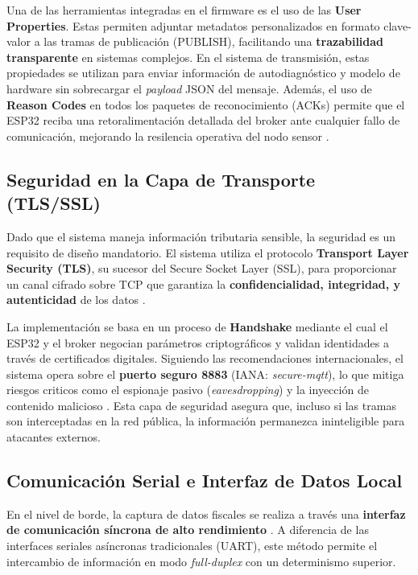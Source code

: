 \par Una de las herramientas integradas en el firmware es el uso de las \textbf{User Properties}. Estas permiten adjuntar metadatos personalizados en formato clave-valor a las tramas de publicación (PUBLISH), facilitando una \textbf{trazabilidad transparente} en sistemas complejos. En el sistema de transmisi\'on, estas propiedades se utilizan para enviar información de autodiagnóstico y modelo de hardware sin sobrecargar el \textit{payload} JSON del mensaje. Además, el uso de \textbf{Reason Codes} en todos los paquetes de reconocimiento (ACKs) permite que el ESP32 reciba una retoralimentación detallada del broker ante cualquier fallo de comunicación, mejorando la resilencia operativa del nodo sensor \cite{OASIS_MQTT_v5}.

\subsection{Seguridad en la Capa de Transporte (TLS/SSL)}

\par Dado que el sistema maneja información tributaria sensible, la seguridad es un requisito de diseño mandatorio. El sistema utiliza el protocolo \textbf{Transport Layer Security (TLS)}, su sucesor del Secure Socket Layer (SSL), para proporcionar un canal cifrado sobre TCP que garantiza la \textbf{confidencialidad, integridad, y autenticidad} de los datos \cite{RFC5246_TLS12, NIST_SP800_52}.\\

\par La implementación se basa en un proceso de \textbf{Handshake} mediante el cual el ESP32 y el broker negocian parámetros criptográficos y validan identidades a través de certificados digitales. Siguiendo las recomendaciones internacionales, el sistema opera sobre el \textbf{puerto seguro 8883} (IANA: \textit{secure-mqtt}), lo que mitiga riesgos criticos como el espionaje pasivo (\textit{eavesdropping}) y la inyección de contenido malicioso \cite{NIST_SP800_52}. Esta capa de seguridad asegura que, incluso si las tramas son interceptadas en la red pública, la información permanezca ininteligible para atacantes externos.

\subsection{Comunicación Serial e Interfaz de Datos Local}

\par En el nivel de borde, la captura de datos fiscales se realiza a través una \textbf{interfaz de comunicación síncrona de alto rendimiento} \cite{TheFactoryHKA_Manual_Protocolos}. A diferencia de las interfaces seriales asíncronas tradicionales (UART), este método permite el intercambio de información en modo \textit{full-duplex} con un determinismo superior.\\

